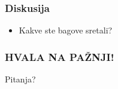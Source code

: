 \documentclass{beamer}
\begin{document}
\begin{frame}
    \frametitle{Diskusija}
    \begin{itemize}
        \item Kakve ste bagove sretali?
    \end{itemize}
\end{frame}

\begin{frame}
    \frametitle{HVALA NA PAŽNJI!}
    \begin{center}
        \Huge Pitanja?    
    \end{center}
\end{frame}
\end{document}

